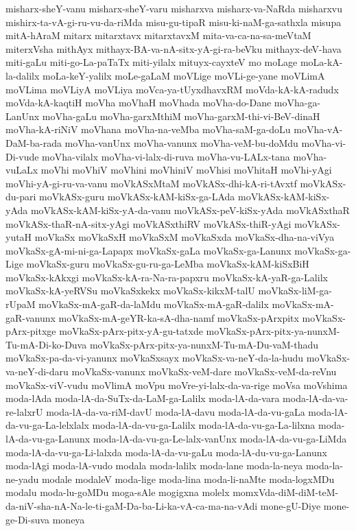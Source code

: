 {misharx-sheY-vanu
misharx-sheY-varu
misharxva
misharx-va-NaRda
misharxvu
mishirx-ta-vA-gi-ru-vu-da-riMda
misu-gu-tipaR
misu-ki-naM-ga-sathxla
misupa
mitA-hAraM
mitarx
mitarxtavx
mitarxtavxM
mita-va-ca-na-sa-meVtaM
miterxVsha
mithAyx
mithayx-BA-va-nA-sitx-yA-gi-ra-beVku
mithayx-deV-hava
miti-gaLu
miti-go-La-paTaTx
miti-yilalx
mituyx-cayxteV
mo
moLage
moLa-kA-la-dalilx
moLa-keY-yalilx
moLe-gaLaM
moVLige
moVLi-ge-yane
moVLimA
moVLima
moVLiyA
moVLiya
moVca-ya-tUyxdhavxRM
moVda-kA-kA-radudx
moVda-kA-kaqtiH
moVha
moVhaH
moVhada
moVha-do-Dane
moVha-ga-LanUnx
moVha-gaLu
moVha-garxMthiM
moVha-garxM-thi-vi-BeV-dinaH
moVha-kA-riNiV
moVhana
moVha-na-veMba
moVha-saM-ga-doLu
moVha-vA-DaM-ba-rada
moVha-vanUnx
moVha-vanunx
moVha-veM-bu-doMdu
moVha-vi-Di-vude
moVha-vilalx
moVha-vi-lalx-di-ruva
moVha-vu-LALx-tana
moVha-vuLaLx
moVhi
moVhiV
moVhini
moVhiniV
moVhisi
moVhitaH
moVhi-yAgi
moVhi-yA-gi-ru-va-vanu
moVkASxMtaM
moVkASx-dhi-kA-ri-tAvxtf
moVkASx-du-pari
moVkASx-guru
moVkASx-kAM-kiSx-ga-LAda
moVkASx-kAM-kiSx-yAda
moVkASx-kAM-kiSx-yA-da-vanu
moVkASx-peV-kiSx-yAda
moVkASxthaR
moVkASx-thaR-nA-sitx-yAgi
moVkASxthiRV
moVkASx-thiR-yAgi
moVkASx-yutaH
moVkaSx
moVkaSxH
moVkaSxM
moVkaSxda
moVkaSx-dha-na-viVya
moVkaSx-gA-mi-ni-ga-Lapapx
moVkaSx-gaLa
moVkaSx-ga-Lanunx
moVkaSx-ga-Lige
moVkaSx-guru
moVkaSx-gu-ru-ga-LeMba
moVkaSx-kAM-kiSxBiH
moVkaSx-kAkxgi
moVkaSx-kA-ra-Na-ra-papxru
moVkaSx-kA-yaR-ga-Lalilx
moVkaSx-kA-yeRVSu
moVkaSxkekx
moVkaSx-kikxM-talU
moVkaSx-liM-ga-rUpaM
moVkaSx-mA-gaR-da-laMdu
moVkaSx-mA-gaR-dalilx
moVkaSx-mA-gaR-vanunx
moVkaSx-mA-geYR-ka-sA-dha-namf
moVkaSx-pArxpitx
moVkaSx-pArx-pitxge
moVkaSx-pArx-pitx-yA-gu-tatxde
moVkaSx-pArx-pitx-ya-nunxM-Tu-mA-Di-ko-Duva
moVkaSx-pArx-pitx-ya-nunxM-Tu-mA-Du-vaM-thadu
moVkaSx-pa-da-vi-yanunx
moVkaSxsayx
moVkaSx-va-neY-da-la-hudu
moVkaSx-va-neY-di-daru
moVkaSx-vanunx
moVkaSx-veM-dare
moVkaSx-veM-da-reVnu
moVkaSx-viV-vudu
moVlimA
moVpu
moVre-yi-lalx-da-va-rige
moVsa
moVshima
moda-lAda
moda-lA-da-SuTx-da-LaM-ga-Lalilx
moda-lA-da-vara
moda-lA-da-va-re-lalxrU
moda-lA-da-va-riM-davU
moda-lA-davu
moda-lA-da-vu-gaLa
moda-lA-da-vu-ga-La-lelxlalx
moda-lA-da-vu-ga-Lalilx
moda-lA-da-vu-ga-La-lilxna
moda-lA-da-vu-ga-Lanunx
moda-lA-da-vu-ga-Le-lalx-vanUnx
moda-lA-da-vu-ga-LiMda
moda-lA-da-vu-ga-Li-lalxda
moda-lA-da-vu-gaLu
moda-lA-du-vu-ga-Lanunx
moda-lAgi
moda-lA-vudo
modala
moda-lalilx
moda-lane
moda-la-neya
moda-la-ne-yadu
modale
modaleV
moda-lige
moda-lina
moda-li-naMte
moda-logxMDu
modalu
moda-lu-goMDu
moga-sAle
mogigxna
molelx
momxVda-diM-diM-teM-da-niV-sha-nA-Na-le-ti-gaM-Da-ba-Li-ka-vA-ca-ma-na-vAdi
mone-gU-Diye
mone-ge-Di-suva
moneya
}
